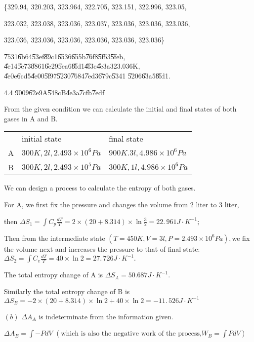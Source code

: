 \documentclass{article}
\begin{document}
\{329.94, 320.203, 323.964, 322.705, 323.151, 322.996, 323.05,

323.032, 323.038, 323.036, 323.037, 323.036, 323.036, 323.036,

323.036, 323.036, 323.036, 323.036, 323.036, 323.036\}

\U{7531}\U{6b64}\U{53ef}\U{89c1}\U{6536}\U{655b}\U{76f8}\U{5f53}\U{5feb},%
\U{4e14}\U{5e73}\U{8861}\U{6e29}\U{5ea6}\U{8fd1}\U{4f3c}\U{4e3a}323.036K,%
\U{4e0e}\U{6cd5}\U{4e00}\U{5f97}\U{5230}\U{7684}\U{7ed3}\U{679c}\U{5341}%
\U{5206}\U{63a5}\U{8fd1}.

4.4 \U{9009}\U{62e9}A\U{548c}B\U{4e3a}\U{7cfb}\U{7edf}

From the given condition we can calculate the initial and final states of
both gases in A and B.

\begin{tabular}{lll}
& initial state & final state \\ 
A & $300\unit{K},2\unit{l},2.493\times 10^{6}\unit{Pa}$ & $\allowbreak 900%
\unit{K}.3\unit{l},4.986\times 10^{6}\unit{Pa}$ \\ 
B & $300\unit{K},2\unit{l},2.493\times 10^{5}\unit{Pa}$ & $300\unit{K},1%
\unit{l},4.986\times 10^{6}\unit{Pa}$%
\end{tabular}

We can design a process to calculate the entropy of both gases.

For A, we first fix the pressure and changes the volume from 2 liter to 3
liter,

then $\Delta S_{1}=\int C_{p}\frac{dT}{T}=2\times \left( 20+8.314\right)
\times \ln \frac{3}{2}=\allowbreak 22.\,\allowbreak 961\unit{J}\cdot \unit{K}%
^{-1};$

Then from the intermediate state $\left( T=450\unit{K},V=3\unit{l}%
,P=2.493\times 10^{6}\unit{Pa}\right) ,$we fix the volume next and increases
the pressure to that of final state: $\Delta S_{2}=\int C_{v}\frac{dT}{T}%
=40\times \ln 2=\allowbreak 27.\,\allowbreak 726\unit{J}\cdot \unit{K}^{-1}.$

The total entropy change of A is $\allowbreak \Delta S_{A}=50.687\unit{J}%
\cdot \unit{K}^{-1}.$

Similarly the total entropy change of B is $\Delta S_{B}=-2\times \left(
20+8.314\right) \times \ln 2+40\times \ln 2=\allowbreak -11.\,\allowbreak 526%
\unit{J}\cdot \unit{K}^{-1}$

$\left( b\right) $ $\Delta A_{A}$ is indeterminate from the information
given. 

$\Delta A_{B}=\int -PdV$ $\left( \text{which is also the negative work of
the process,}W_{B}=\int PdV\right) $
\end{document}
